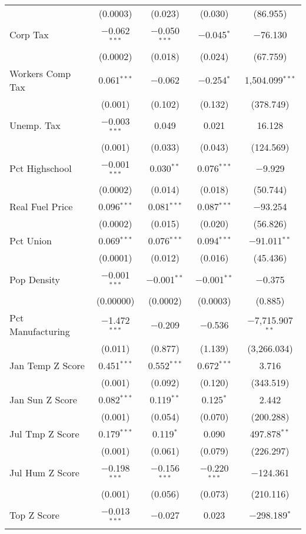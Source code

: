 \begin{table}[!htbp]
\begin{tabular}{@{\extracolsep{5pt}}lcccc}
  & (0.0003) & (0.023) & (0.030) & (86.955) \\ 
  Corp Tax & $-$0.062$^{***}$ & $-$0.050$^{***}$ & $-$0.045$^{*}$ & $-$76.130 \\ 
  & (0.0002) & (0.018) & (0.024) & (67.759) \\ 
  Workers Comp Tax & 0.061$^{***}$ & $-$0.062 & $-$0.254$^{*}$ & 1,504.099$^{***}$ \\ 
  & (0.001) & (0.102) & (0.132) & (378.749) \\ 
  Unemp. Tax & $-$0.003$^{***}$ & 0.049 & 0.021 & 16.128 \\ 
  & (0.001) & (0.033) & (0.043) & (124.569) \\ 
  Pct Highschool & $-$0.001$^{***}$ & 0.030$^{**}$ & 0.076$^{***}$ & $-$9.929 \\ 
  & (0.0002) & (0.014) & (0.018) & (50.744) \\ 
  Real Fuel Price & 0.096$^{***}$ & 0.081$^{***}$ & 0.087$^{***}$ & $-$93.254 \\ 
  & (0.0002) & (0.015) & (0.020) & (56.826) \\ 
  Pct Union & 0.069$^{***}$ & 0.076$^{***}$ & 0.094$^{***}$ & $-$91.011$^{**}$ \\ 
  & (0.0001) & (0.012) & (0.016) & (45.436) \\ 
  Pop Density & $-$0.001$^{***}$ & $-$0.001$^{**}$ & $-$0.001$^{**}$ & $-$0.375 \\ 
  & (0.00000) & (0.0002) & (0.0003) & (0.885) \\ 
  Pct Manufacturing & $-$1.472$^{***}$ & $-$0.209 & $-$0.536 & $-$7,715.907$^{**}$ \\ 
  & (0.011) & (0.877) & (1.139) & (3,266.034) \\ 
  Jan Temp Z Score & 0.451$^{***}$ & 0.552$^{***}$ & 0.672$^{***}$ & 3.716 \\ 
  & (0.001) & (0.092) & (0.120) & (343.519) \\ 
  Jan Sun Z Score & 0.082$^{***}$ & 0.119$^{**}$ & 0.125$^{*}$ & 2.442 \\ 
  & (0.001) & (0.054) & (0.070) & (200.288) \\ 
  Jul Tmp Z Score & 0.179$^{***}$ & 0.119$^{*}$ & 0.090 & 497.878$^{**}$ \\ 
  & (0.001) & (0.061) & (0.079) & (226.297) \\ 
  Jul Hum Z Score & $-$0.198$^{***}$ & $-$0.156$^{***}$ & $-$0.220$^{***}$ & $-$124.361 \\ 
  & (0.001) & (0.056) & (0.073) & (210.116) \\ 
  Top Z Score & $-$0.013$^{***}$ & $-$0.027 & 0.023 & $-$298.189$^{*}$ \\ 

\end{tabular}
\end{table}
